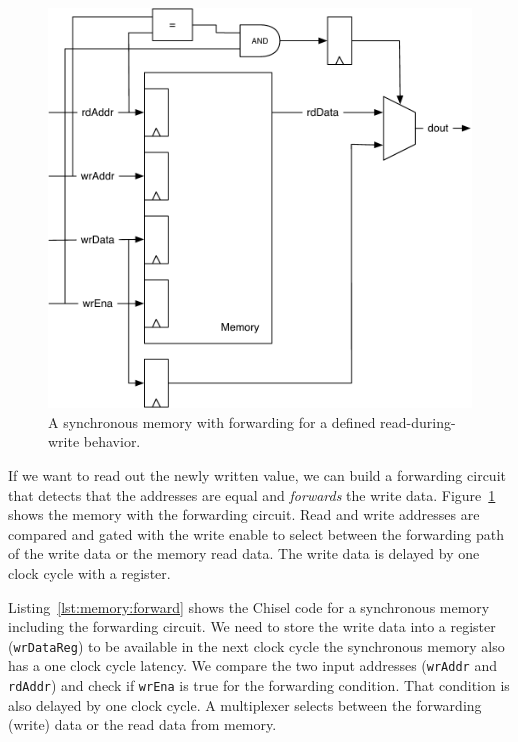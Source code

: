 \documentclass[%
    10pt,
    headinclude, footexclude,
    openright, %
    notitlepage,
    cleardoubleempty,
    headsepline,
    pointlessnumbers,
    bibtotoc, idxtotoc,
    ]{scrbook}
\newcommand{\code}[1]{{\small{\texttt{#1}}}}
\newcommand{\scale}{0.7}
\begin{document}
\begin{figure}
  \centering
  \includegraphics[scale=\scale]{figures/memory-forwarding}
  \caption{A synchronous memory with forwarding for a defined read-during-write behavior.}
  \label{fig:memory:forwarding}
\end{figure}

If we want to read out the newly written value, we can build a forwarding
circuit that detects that the addresses are equal and \emph{forwards} the
write data. Figure~\ref{fig:memory:forwarding} shows the memory with
the forwarding circuit. Read and write addresses are compared and gated with
the write enable to select between the forwarding path of the write data or the
memory read data. The write data is delayed by one clock cycle with a register.

Listing~\ref{lst:memory:forward} shows the Chisel code for a synchronous memory
including the forwarding circuit. We need to store the write data into a register
(\code{wrDataReg}) to be available in the next clock cycle the synchronous
memory also has a one clock cycle latency.
We compare the two input addresses (\code{wrAddr} and \code{rdAddr})
and check if \code{wrEna} is true for the forwarding condition.
That condition is also delayed by one clock cycle.
A multiplexer selects between the forwarding (write) data or the read
data from memory.

\end{document}
